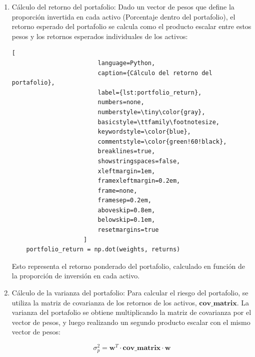 \documentclass[9pt,a4paper,twoside]{rho-class/rho}
\begin{document}
            \begin{enumerate}
                \item Cálculo del retorno del portafolio: Dado un vector de pesos que define la proporción invertida en cada activo (Porcentaje dentro del portafolio), el retorno esperado del portafolio se calcula como el producto escalar entre estos pesos y los retornos esperados individuales de los activos:
                
                    \begin{lstlisting}[
                        language=Python,
                        caption={Cálculo del retorno del portafolio},
                        label={lst:portfolio_return},
                        numbers=none,
                        numberstyle=\tiny\color{gray},
                        basicstyle=\ttfamily\footnotesize,
                        keywordstyle=\color{blue},
                        commentstyle=\color{green!60!black},
                        breaklines=true,
                        showstringspaces=false,
                        xleftmargin=1em,
                        framexleftmargin=0.2em,
                        frame=none,
                        framesep=0.2em,
                        aboveskip=0.8em,
                        belowskip=0.1em,
                        resetmargins=true
                    ]
    portfolio_return = np.dot(weights, returns)
                    \end{lstlisting}

                    Esto representa el retorno ponderado del portafolio, calculado en función de la proporción de inversión en cada activo.

                \item Cálculo de la varianza del portafolio: Para calcular el riesgo del portafolio, se utiliza la matriz de covarianza de los retornos de los activos, $\textbf{cov\_matrix}$. La varianza del portafolio se obtiene multiplicando la matriz de covarianza por el vector de pesos, y luego realizando un segundo producto escalar con el mismo vector de pesos:
                
                    \begin{equation}
                        \sigma^2_p = \mathbf{w}^T \cdot \mathbf{cov\_matrix} \cdot \mathbf{w}
                    \end{equation}
                    

\end{enumerate}
\end{document}
